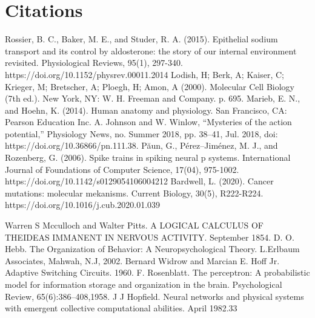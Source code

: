 \documentclass[12pt,a4paper]{report}
\begin{document}
\chapter{Citations}

\begin{thebibliography}{9}
   
      Rossier, B. C., Baker, M. E., and Studer, R. A. (2015). Epithelial sodium transport and its control by aldosterone: the story of our internal environment revisited. Physiological Reviews, 95(1), 297-340. https://doi.org/10.1152/physrev.00011.2014
      Lodish, H; Berk, A; Kaiser, C; Krieger, M; Bretscher, A; Ploegh, H; Amon, A (2000). Molecular Cell Biology (7th ed.). New York, NY: W. H. Freeman and Company. p. 695.
      Marieb, E. N., and Hoehn, K. (2014). Human anatomy and physiology. San Francisco, CA: Pearson Education Inc.
     A. Johnson and W. Winlow, “Mysteries of the action potential,” Physiology News, no. Summer 2018, pp. 38–41, Jul. 2018, doi: https://doi.org/10.36866/pn.111.38.
    Păun, G., Pérez–Jiménez, M. J., and Rozenberg, G. (2006). Spike trains in spiking neural p systems. International Journal of Foundations of Computer Science, 17(04), 975-1002. https://doi.org/10.1142/s0129054106004212
     Bardwell, L. (2020). Cancer mutations: molecular mekanisms. Current Biology, 30(5), R222-R224. https://doi.org/10.1016/j.cub.2020.01.039


     Warren S Mcculloch and Walter Pitts. A LOGICAL CALCULUS OF THEIDEAS IMMANENT IN NERVOUS ACTIVITY. September 1854.
     D. O. Hebb. The Organization of Behavior: A Neuropsychological Theory. L.Erlbaum Associates, Mahwah, N.J, 2002.
     Bernard Widrow and Marcian E. Hoff Jr. Adaptive Switching Circuits. 1960.
     F. Rosenblatt. The perceptron: A probabilistic model for information storage and organization in the brain. Psychological Review, 65(6):386–408,1958.
     J J Hopfield. Neural networks and physical systems with emergent collective computational abilities. April 1982.33
    

\end{thebibliography}
\end{document}
